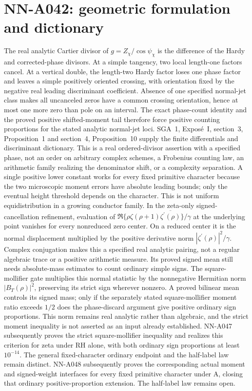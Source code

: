\section{NN-A042: geometric formulation and dictionary}
\begin{geometricstatement}[NN-A042]
The real analytic Cartier divisor of $g=Z_\chi/\cos\psi_\chi$ is the difference of the Hardy and corrected-phase divisors. At a simple tangency, two local length-one factors cancel. At a vertical double, the length-two Hardy factor loses one phase factor and leaves a simple positively oriented crossing, with orientation fixed by the negative real leading discriminant coefficient. Absence of one specified normal-jet class makes all uncanceled zeros have a common crossing orientation, hence at most one more zero than pole on an interval. The exact phase-count identity and the proved positive shifted-moment tail therefore force positive counting proportions for the stated analytic normal-jet loci. SGA~1, Expos\'e~I, section~3, Proposition~1 and section~4, Proposition~10 supply the finite differentials and discriminant dictionary. This is a real ordered-divisor assertion with a specified phase, not an order on arbitrary complex schemes, a Frobenius counting law, an arithmetic family realizing the denominator shift, or a complexity separation. A single positive lower constant works for every fixed primitive character because the two microscopic moment errors have absolute leading bounds; only the eventual height threshold depends on the character. This is not uniform equidistribution in a growing conductor family. In the zeta-only signed-cancellation refinement, evaluation of $\Re\{\rho\zeta(\rho+1)\overline{\zeta^\prime(\rho)}\}/\gamma$ at the underlying point vanishes for every nonreduced zero center. On a reduced center it is the normal displacement multiplied by the positive derivative norm $|\zeta^\prime(\rho)|^2/\gamma$. Complex conjugation makes this a specified real analytic pairing, not a regular algebraic trace or a positive arithmetic measure. Its proved signed mean still needs absolute-mass estimates to count ordinary simple signs. The square-mollifier gate multiplies this normal statistic by the nonnegative Hermitian norm $|B_T(\rho)|^2$, preserving its strict sign wherever nonzero. A proved bilinear mean controls its signed mass; only if the separately stated square-mollifier moment ratio exceeds $1/2$ does the phase-discard argument give positive ordinary sign proportions. This norm remains real analytic rather than algebraic, and the strict moment inequality is not asserted as an input already established. NN-A047 subsequently proves the strict square-mollifier inequality and realizes this criterion for zeta under RH alone, with both ordinary sign proportions at least $10^{-14}$. The general fixed-character ordinary endpoint and the half-label law remain distinct. NN-A048 subsequently proves the corresponding actual moment and signed-weight interfaces for every fixed primitive character under A, closing that ordinary positive-proportion extension. The half-label law remains open.
\end{geometricstatement}
